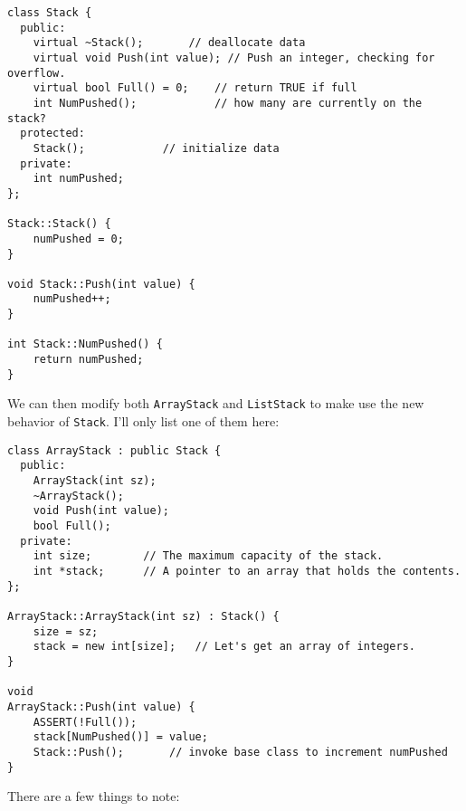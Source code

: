 \begin{verbatim}
class Stack {
  public:
    virtual ~Stack();		// deallocate data
    virtual void Push(int value); // Push an integer, checking for overflow.
    virtual bool Full() = 0;	// return TRUE if full
    int NumPushed();	        // how many are currently on the stack?
  protected:
    Stack();			// initialize data
  private:
    int numPushed;
};

Stack::Stack() { 
    numPushed = 0; 
}

void Stack::Push(int value) { 
    numPushed++; 
}

int Stack::NumPushed() { 
    return numPushed; 
}
\end{verbatim}

We can then modify both {\tt ArrayStack} and {\tt ListStack}
to make use the new behavior of {\tt Stack}.  I'll only list
one of them here:

\begin{verbatim}
class ArrayStack : public Stack {
  public:
    ArrayStack(int sz);   
    ~ArrayStack();        
    void Push(int value); 
    bool Full();     
  private:
    int size;        // The maximum capacity of the stack.
    int *stack;      // A pointer to an array that holds the contents.
};

ArrayStack::ArrayStack(int sz) : Stack() { 
    size = sz;
    stack = new int[size];   // Let's get an array of integers.
}

void
ArrayStack::Push(int value) {
    ASSERT(!Full());
    stack[NumPushed()] = value;
    Stack::Push();	     // invoke base class to increment numPushed
}
\end{verbatim}

There are a few things to note:

